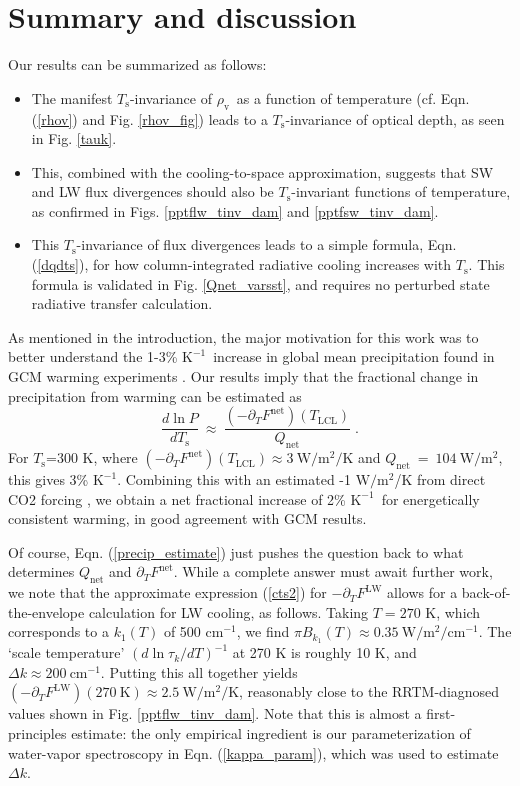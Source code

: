 \documentclass[10pt]{article}
\newcommand{\beqn}{\begin{equation}}
\newcommand{\eeqn}{\end{equation}}
\newcommand{\eqnref}[1]{(\ref{#1})}
\newcommand{\inverse}{^{-1}}
\newcommand{\ppt}{\ensuremath{\partial_T}}
\newcommand{\Qnet}{\ensuremath{Q_\mathrm{net}}}
\newcommand{\FLW}{\ensuremath{F^\mathrm{LW}}}
\newcommand{\Fnet}{\ensuremath{F^\mathrm{net}}}
\newcommand{\cminverse}{\ensuremath{\mathrm{cm^{-1}}}}
\newcommand{\tauk}{\ensuremath{\tau_k}}
\newcommand{\Wmsq}{\ensuremath{\mathrm{W/m^2}}}
\newcommand{\rhov}{\ensuremath{\rho_\mathrm{v}}}
\newcommand{\Ts}{\ensuremath{T_\mathrm{s}}}
\newcommand{\Tlcl}{\ensuremath{T_\mathrm{LCL}}}
\newcommand{\Kinverse}{\ensuremath{\mathrm{K^{-1}}}}
\begin{document}

\section{Summary and discussion} \label{sec_summary}
Our results can be summarized as follows:
\begin{itemize}
	\item The manifest \Ts-invariance of \rhov\ as a function of temperature (cf. Eqn. \eqnref{rhov} and Fig. \ref{rhov_fig}) leads to a \Ts-invariance of optical depth, as seen in Fig. \ref{tauk}.
	\item This, combined with the cooling-to-space approximation, suggests that SW and LW flux divergences should also be \Ts-invariant functions of temperature, as confirmed in Figs. \ref{pptflw_tinv_dam} and \ref{pptfsw_tinv_dam}.
	\item This \Ts-invariance of flux divergences leads to a simple formula, Eqn. \eqnref{dqdts}, for how column-integrated radiative cooling increases with \Ts. This formula is validated in Fig. \ref{Qnet_varsst},  and requires no perturbed state radiative transfer calculation.
	\end{itemize}

As mentioned in the introduction, the major motivation for this work was to better understand the 1-3\% \Kinverse\ increase in global mean precipitation found in GCM warming experiments \citep{stephens2008, lambert2008,held2006}.  Our results imply that the fractional change in precipitation from warming can be estimated as 
	\beqn
		\frac{d \ln  P}{d \Ts} \ \approx\  \frac{(-\ppt \Fnet)(\Tlcl)}{\Qnet} \; .
	\label{precip_estimate}
	\eeqn
For \Ts=300 K, where $(-\ppt \Fnet)(\Tlcl) \approx 3 \ \Wmsq/\mathrm{K}$ and $\Qnet\ =\  104\ \Wmsq$, this  gives  3\% \Kinverse. Combining this with an estimated -1 \Wmsq/K from direct CO2 forcing \citep{pendergrass2014}, we obtain a net fractional increase of 2\% \Kinverse\ for energetically consistent warming, in good agreement with GCM results.

Of course, Eqn. \eqnref{precip_estimate}  just pushes the question back to what determines $\Qnet$ and $\ppt \Fnet$.  While a complete answer must await further work, we note that the approximate expression  \eqnref{cts2} for $-\ppt \FLW$ allows for a back-of-the-envelope calculation for LW cooling, as follows.   Taking $T=270$ K, which corresponds to a $k_1(T)$ of 500 \cminverse, we find $\pi B_{k_1}(T) \approx 0.35 \ \Wmsq/\cminverse$. The `scale temperature' $(d \ln \tauk/d T)\inverse$ at 270 K is roughly 10 K, and $\Delta k \approx 200 \ \cminverse$. Putting this all together yields $(-\ppt \FLW)(270\ \mathrm{K}) \approx 2.5 \ \Wmsq/\mathrm{K}$, reasonably close to the RRTM-diagnosed values shown in Fig. \ref{pptflw_tinv_dam}. Note that this is almost a first-principles estimate: the only empirical ingredient is our parameterization of water-vapor spectroscopy in Eqn. \eqnref{kappa_param}, which was used to estimate $\Delta k$.
\end{document}

